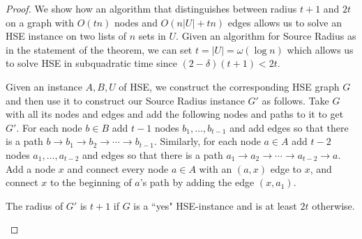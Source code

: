 \begin{proof}

We show how an algorithm that distinguishes between radius $t+1$ and $2t$ on a graph with $O(tn)$ nodes and $O(n |U| + tn)$ edges allows us to solve an HSE instance on two lists of $n$ sets in $U$.
Given an algorithm for Source Radius as in the statement of the theorem, we can
set $t=|U|=\omega(\log{n})$ which allows us to solve HSE in subquadratic time since $(2-\delta)(t+1) <2t$.

Given an instance $A,B,U$ of HSE, we construct the corresponding HSE graph $G$ and then use it to construct our Source Radius instance $G'$ as follows.
Take $G$ with all its nodes and edges and add the following nodes and paths to it to get $G'$.
For each node $b \in B$ add $t-1$ nodes $b_1,\ldots,b_{t-1}$ and add edges so that there is a path $b \to b_1 \to b_2 \to \cdots \to b_{t-1}$.
Similarly, for each node $a \in A$ add $t-2$ nodes $a_1,\ldots,a_{t-2}$ and edges so that there is a path $a_1 \to a_2 \to \cdots \to a_{t-2} \to a$.
Add a node $x$ and connect every node $a \in A$ with an $(a,x)$ edge to $x$, and connect $x$ to the beginning of $a$'s path by adding the edge $(x,a_1)$.


\begin{claim}
The radius of $G'$ is $t+1$ if $G$ is a ``yes" HSE-instance and is at least $2t$ otherwise.
\end{claim}


\end{proof}
